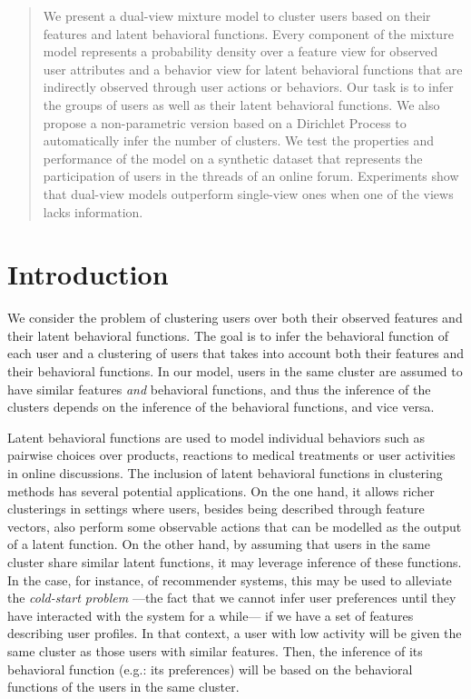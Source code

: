 \documentclass[smallextended]{svjour3}          %
\begin{document}
\maketitle
\begin{abstract}
We present a dual-view mixture model to cluster users based on their features and latent behavioral functions. Every component of the mixture model represents a probability density over a feature view for observed user attributes and a behavior view for latent behavioral functions that are indirectly observed through user actions or behaviors. Our task is to infer the groups of users as well as their latent behavioral functions. We also propose a non-parametric version based on a Dirichlet Process to automatically infer the number of clusters. We test the properties and performance of the model on a synthetic dataset that represents the participation of users in the threads of an online forum. Experiments show that dual-view models outperform single-view ones when one of the views lacks information.
\end{abstract}
\section{Introduction}\label{sec:introduction}
We consider the problem of clustering users over both their observed features and their latent behavioral functions. The goal is to infer the behavioral function of each user and a clustering of users that takes into account both their features and their behavioral functions. In our model, users in the same cluster are assumed to have similar features \textit{and} behavioral functions, and thus the inference of the clusters depends on the inference of the behavioral functions, and vice versa.

Latent behavioral functions are used to model individual behaviors such as pairwise choices over products, reactions to medical treatments or user activities in online discussions. The inclusion of latent behavioral functions in clustering methods has several potential applications. On the one hand, it allows richer clusterings in settings where users, besides being described through feature vectors, also perform some observable actions that can be modelled as the output of a latent function. On the other hand, by assuming that users in the same cluster share similar latent functions, it may leverage inference of these functions. In the case, for instance, of recommender systems, this may be used to alleviate the \textit{cold-start problem} ---the fact that we cannot infer user preferences until they have interacted with the system for a while--- if we have a set of features describing user profiles. In that context, a user with low activity will be given the same cluster as those users with similar features. Then, the inference of its behavioral function (e.g.: its preferences) will be based on the behavioral functions of the users in the same cluster.
\end{document}
